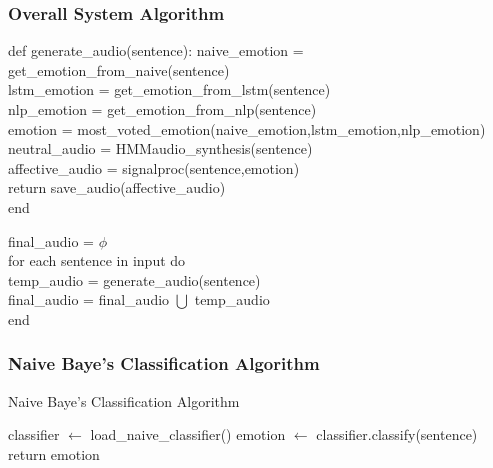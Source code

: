 \documentclass[oneside,a4paper,12pt]{book}
\begin{document}
  \subsubsection{Overall System Algorithm}
  def generate\_audio(sentence): \newline
	  \hspace*{10mm} naive\_emotion = get\_emotion\_from\_naive(sentence) \\
	  \hspace*{12mm}lstm\_emotion = get\_emotion\_from\_lstm(sentence) \\
	  \hspace*{12mm}nlp\_emotion = get\_emotion\_from\_nlp(sentence) \\
	  \hspace*{11mm} emotion = most\_voted\_emotion(naive\_emotion,lstm\_emotion,nlp\_emotion) \\
	  \hspace*{12mm}neutral\_audio = HMMaudio\_synthesis(sentence) \\
	  \hspace*{12mm}affective\_audio = signalproc(sentence,emotion) \\
	  \hspace*{12mm}return save\_audio(affective\_audio) \\
	  end \newline
	  
	  final\_audio = $\phi$ \\
	  \hspace*{11mm}for each sentence in input do \\
	  \hspace*{16mm}temp\_audio =  generate\_audio(sentence)\\
	  \hspace*{16mm}final\_audio = final\_audio $\bigcup$ temp\_audio \\
	  end\\

	\subsubsection{Naive Baye's Classification Algorithm}
		 \begin{algorithm}
\caption{Naive Baye's Classification Algorithm}
\label{NaiveBayes}
\begin{algorithmic}[1]
\State classifier $\leftarrow$ load\_naive\_classifier()
\State emotion $\leftarrow$ classifier.classify(sentence)
\State return emotion
\EndProcedure
\end{algorithmic}
\end{algorithm}
\end{document}
